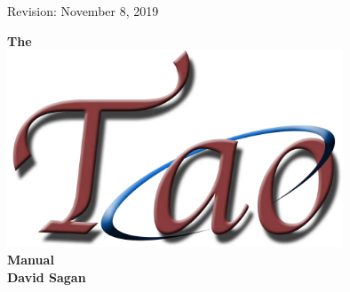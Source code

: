 \thispagestyle{empty}

\begin{flushright}
\large
Revision: November 8, 2019 \\
\end{flushright}

\vfill


{
\begin{center}
{\Huge \sf\bf The} \\
\vskip 0.1in
\includegraphics[width=10cm]{tao-logo.pdf} \\
\vskip 0.1in
{\Huge \sf\bf Manual} \\
\vskip 0.4in
{\huge \sf\bf David Sagan} \\
\end{center}
}

\vfill
\break
